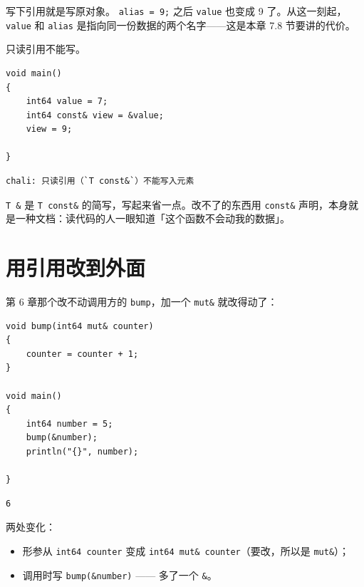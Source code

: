 写下引用就是写原对象。 \texttt{alias =\allowbreak{} 9;} 之后 \texttt{value} 也变成 9 了。从这一刻起，\texttt{value} 和 \texttt{alias} 是指向同一份数据的两个名字——这是本章 7.8 节要讲的代价。

只读引用不能写。

\par
\medskip
\begin{lstlisting}[style=chali]
void main()
{
    int64 value = 7;
    int64 const& view = &value;
    view = 9;

}
\end{lstlisting}
\par
\medskip

\par
\medskip
\begin{lstlisting}[style=out]
chali: 只读引用（`T const&`）不能写入元素
\end{lstlisting}
\par
\medskip

\texttt{T \&} 是 \texttt{T const\&} 的简写，写起来省一点。改不了的东西用 \texttt{const\&} 声明，本身就是一种文档：读代码的人一眼知道「这个函数不会动我的数据」。

\section{用引用改到外面}

第 6 章那个改不动调用方的 \texttt{bump}，加一个 \texttt{mut\&} 就改得动了：

\par
\medskip
\begin{lstlisting}[style=chali]
void bump(int64 mut& counter)
{
    counter = counter + 1;
}

void main()
{
    int64 number = 5;
    bump(&number);
    println("{}", number);

}
\end{lstlisting}
\par
\medskip

\par
\medskip
\begin{lstlisting}[style=out]
6
\end{lstlisting}
\par
\medskip

两处变化：

\begin{itemize}

\item 形参从 \texttt{int64 counter} 变成 \texttt{int64 mut\& counter}（要改，所以是 \texttt{mut\&}）；

\item 调用时写 \texttt{bump(\allowbreak{}\&number)\allowbreak{}} —— 多了一个 \texttt{\&}。

\end{itemize}

